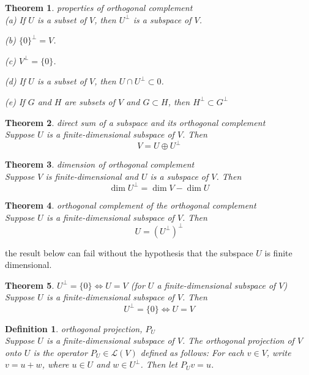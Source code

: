 \documentclass{article}
\newtheorem{theorem}{Theorem}[subsection]
\newtheorem{definition}{Definition}[subsection]
\begin{document}
\begin{CJK}{UTF8}{gkai}
\begin{theorem}
    properties of orthogonal complement\\

    (a) If $U$ is a subset of $V$, then $U^\bot$ is a subspace of $V$.

    (b) $\{0\}^\bot = V$.

    (c) $V^\bot = \{0\}$.

    (d) If $U$ is a subset of $V$, then $U \cap U^\bot \subset {0}$.

    (e) If $G$ and $H$ are subsets of $V$ and $G \subset H$, then $H^\bot \subset G^\bot$
\end{theorem}

\begin{theorem}
    direct sum of a subspace and its orthogonal complement\\

    Suppose $U$ is a finite-dimensional subspace of $V$. Then
    \[V =U\oplus U^\bot\]
\end{theorem}

\begin{theorem}
    dimension of orthogonal complement\\

    Suppose $V$ is finite-dimensional and $U$ is a subspace of $V$. Then
    \[\dim U^\bot = \dim V - \dim U\]
\end{theorem}

\begin{theorem}
    orthogonal complement of the orthogonal complement\\
    Suppose $U$ is a finite-dimensional subspace of $V$. Then
    \[U =(U^\bot)^\bot\]
\end{theorem}
the result below can fail without the hypothesis that the subspace $U$ is finite dimensional.

\begin{theorem}
    $U^\bot =\{0\} \Leftrightarrow U = V$ (for $U$ a finite-dimensional subspace of $V$)\\

    Suppose $U$ is a finite-dimensional subspace of $V$. Then
    \[U^\bot =\{0\} \Leftrightarrow U=V\]
\end{theorem}

\begin{definition}
    orthogonal projection, $P_U$\\

    Suppose $U$ is a finite-dimensional subspace of $V$. The orthogonal projection of $V$ onto $U$ is the operator $P_U \in \mathcal{L}(V)$ defined as follows: For each $v \in V$,
    write $v = u+w$, where $u \in U$ and $w \in U^\bot$. Then let $P_U v = u$.
\end{definition}


\end{CJK}
\end{document}
